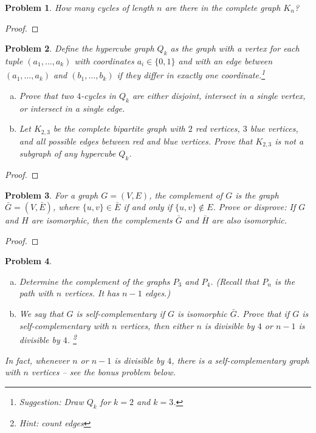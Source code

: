 \documentclass[11pt]{article}
\newtheorem{problem}{Problem}
\begin{document}
\begin{problem}
How many cycles of length $n$ are there in the complete graph $K_n$?
\end{problem}

\begin{proof}

\end{proof}

\begin{problem}
Define the hypercube graph $Q_k$ as the graph with a vertex for each tuple $(a_1,\ldots,a_k)$ with coordinates $a_i\in\{0,1\}$ and with an edge between $(a_1,\ldots,a_k)$ and $(b_1,\ldots,b_k)$ if they differ in exactly one coordinate.\footnote{Suggestion: Draw $Q_k$ for $k=2$ and $k=3$.} 
\begin{enumerate}[(a)]
\item Prove that two $4$-cycles in $Q_k$ are either disjoint, intersect in a single vertex, or intersect in a single edge.
\item Let $K_{2,3}$ be the complete bipartite graph with $2$ red vertices, $3$ blue vertices, and all possible edges between red and blue vertices. Prove that $K_{2,3}$ is not a subgraph of any hypercube $Q_k$. 
\end{enumerate} 
\end{problem}

\begin{proof}

\end{proof}

\begin{problem}
For a graph $G=(V,E)$, the complement of $G$ is the graph $\bar G=(V,\bar E)$, where $\{u,v\}\in\bar E$ if and only if $\{u,v\}\notin E$. Prove or disprove: If $G$ and $H$ are isomorphic, then the complements $\bar G$ and $\bar H$ are also isomorphic. 
\end{problem}

\begin{proof}

\end{proof}


\begin{problem}\ 
\begin{enumerate}[(a)]
\item Determine the complement of the graphs $P_3$ and $P_4$. (Recall that $P_n$ is the path with $n$ vertices. It has $n-1$ edges.)
\item We say that $G$ is self-complementary if $G$ is isomorphic $\bar G$. Prove that if $G$ is self-complementary with $n$ vertices, then either $n$ is divisible by $4$ or $n-1$ is divisible by $4$. \footnote{Hint: count edges}
\end{enumerate} 
In fact, whenever $n$ or $n-1$ is divisible by $4$, there is a self-complementary graph with $n$ vertices -- see the bonus problem below. 
\end{problem}
\end{document}
